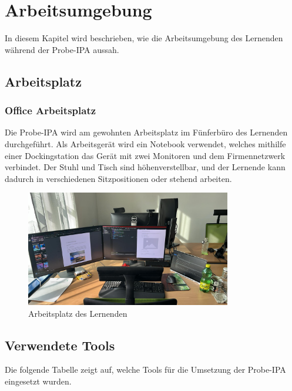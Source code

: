 \chapter{Arbeitsumgebung}\label{ch:arbeitsumgebung}
In diesem Kapitel wird beschrieben, wie die Arbeitsumgebung des Lernenden während der Probe-IPA aussah.


\section{Arbeitsplatz}\label{sec:arbeitsplatz}
\subsection{Office Arbeitsplatz}\label{subsec:office-arbeitsplatz}
Die Probe-IPA wird am gewohnten Arbeitsplatz im Fünferbüro des Lernenden durchgeführt. Als Arbeitsgerät wird ein Notebook verwendet, welches mithilfe einer Dockingstation das Gerät mit zwei Monitoren und dem Firmennetzwerk verbindet. Der Stuhl und Tisch sind höhenverstellbar, und der Lernende kann dadurch in verschiedenen Sitzpositionen oder stehend arbeiten.

\begin{figure}[H]
    \begin{center}
        \includegraphics[width=0.8\textwidth]{ressourcen/Arbeitsplatz-Joel-Vontobel}
        \caption[Arbeitsplatz des Lernenden]{Arbeitsplatz des Lernenden}\label{fig:Arbeitsplatz-Joel-Vontobel}
    \end{center}
\end{figure}

\newpage
\section{Verwendete Tools}\label{sec:verwendete-tools}
Die folgende Tabelle zeigt auf, welche Tools für die Umsetzung der Probe-IPA eingesetzt wurden.

